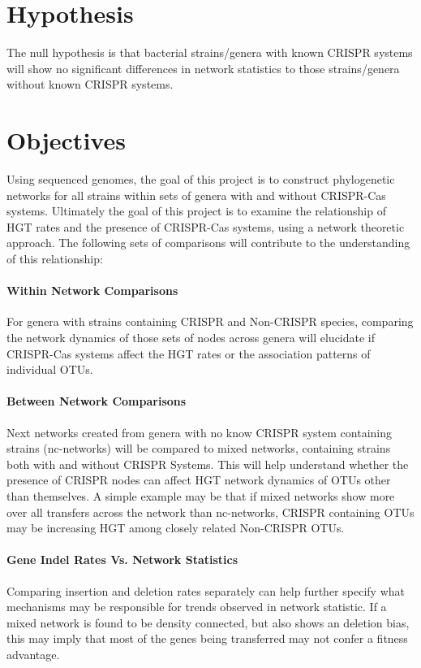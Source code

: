 \documentclass[12pt,letter]{article}
\begin{document}
\section{\huge Hypothesis}
The null hypothesis is that bacterial strains/genera with known CRISPR systems will show no significant differences in network statistics to those strains/genera without known CRISPR systems.
\section{\huge Objectives}
Using sequenced genomes, the goal of this project is to construct phylogenetic networks for all strains within sets of genera with and without CRISPR-Cas systems.
Ultimately the goal of this project is to examine the relationship of HGT rates and the presence of CRISPR-Cas systems, using a network theoretic approach. The following sets of comparisons will contribute to the understanding of this relationship:
\paragraph*{Within Network Comparisons}%
For genera with strains containing CRISPR and Non-CRISPR species, comparing the network dynamics of those sets of nodes across genera will elucidate if CRISPR-Cas systems affect the HGT rates or the association patterns of individual OTUs.
\paragraph*{Between Network Comparisons}%
Next networks created from genera with no know CRISPR system containing strains (nc-networks) will be compared to mixed networks, containing strains both with and without CRISPR Systems.
This will help understand whether the presence of CRISPR nodes can affect HGT network dynamics of OTUs other than themselves.
A simple example may be that if mixed networks show more over all transfers across the network than nc-networks, CRISPR containing OTUs may be increasing HGT among closely related Non-CRISPR OTUs.
\paragraph*{Gene Indel Rates Vs. Network Statistics}%
Comparing insertion and  deletion rates separately can help further specify what mechanisms may be responsible for trends observed in network statistic.
If a mixed network is found to be density connected, but also shows an deletion bias, this may imply that most of the genes being transferred may not confer a fitness advantage.
\end{document}
